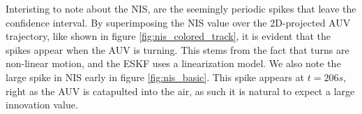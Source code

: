 Interisting to note about the NIS, are the seemingly periodic spikes that leave the confidence interval. By superimposing the NIS value over the 2D-projected AUV trajectory, like shown in figure \ref{fig:nis_colored_track}, it is evident that the spikes appear when the AUV is turning. This stems from the fact that turns are non-linear motion, and the ESKF uses a linearization model. We also note the large spike in NIS early in figure \ref{fig:nis_basic}. This spike appears at $t=206s$, right as the AUV is catapulted into the air, as such it is natural to expect a large innovation value.
